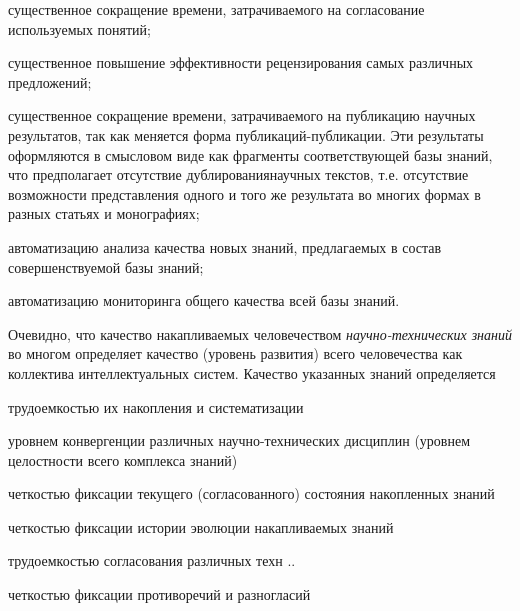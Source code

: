 \begin{scnsubstruct}
{        \begin{scnitemize}
            \item существенное сокращение времени, затрачиваемого на согласование используемых понятий;
            \item существенное повышение эффективности рецензирования самых различных предложений;
            \item существенное сокращение времени, затрачиваемого на публикацию научных результатов, так как меняется форма публикаций-публикации. Эти результаты оформляются в смысловом виде как фрагменты соответствующей базы знаний, что предполагает отсутствие дублированиянаучных текстов, т.е. отсутствие возможности представления одного и того же результата во многих формах в разных статьях и монографиях;
            \item автоматизацию анализа качества новых знаний, предлагаемых в состав совершенствуемой базы знаний;
            \item автоматизацию мониторинга общего качества всей базы знаний.
        \end{scnitemize}
        Очевидно, что качество накапливаемых человечеством \textit{научно-технических знаний} во многом определяет качество (уровень развития) всего человечества как коллектива интеллектуальных систем. Качество указанных знаний определяется
        \begin{scnitemize}
            \item трудоемкостью их накопления и систематизации
            \item уровнем конвергенции различных научно-технических дисциплин (уровнем целостности всего комплекса знаний)
            \item четкостью фиксации текущего (согласованного) состояния накопленных знаний
            \item четкостью фиксации истории эволюции накапливаемых знаний
            \item трудоемкостью согласования различных техн ..
            \item четкостью фиксации противоречий и разногласий
        \end{scnitemize}
    }

\end{scnsubstruct}
